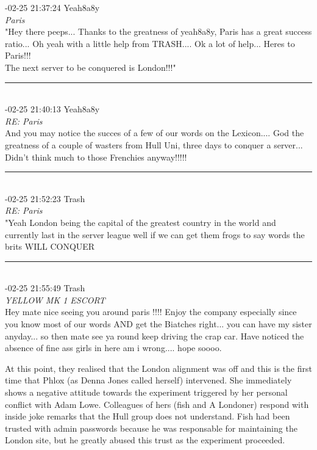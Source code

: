 \begin{mail}
{-02-25 21:37:24 Yeah8a8y}\\
{\itshape Paris}\\
"Hey there peeps... Thanks to the greatness of yeah8a8y, Paris has a great success ratio... Oh yeah with a little help from TRASH.... Ok a lot of help... Heres to Paris!!!\\
The next server to be conquered is London!!!"\\
\rule{0.8\textwidth}{.4pt}\\
{-02-25 21:40:13 Yeah8a8y}\\
{\itshape RE: Paris}\\
And you may notice the succes of a few of our words on the Lexicon.... God the greatness of a couple of wasters from Hull Uni, three days to conquer a server... Didn't think much to those Frenchies anyway!!!!!\\
\rule{0.8\textwidth}{.4pt}\\
{-02-25 21:52:23 Trash}\\
{\itshape RE: Paris}\\
"Yeah London being the capital of the greatest country in the world and currently last in the server league well if we can get them frogs to say words the brits WILL CONQUER\\
\rule{0.8\textwidth}{.4pt}\\
{-02-25 21:55:49 Trash}\\
{\itshape YELLOW MK 1 ESCORT}\\
Hey mate nice seeing you around paris !!!! Enjoy the company especially since you know most of our words AND get the Biatches right... you can have my sister anyday... so then mate see ya round keep driving the crap car.	
Have noticed the absence of fine ass girls in here am i wrong.... hope soooo.\\
 
\end{mail}

At this point, they realised that the London alignment was off and this is the first time that Phlox (as Denna 
Jones called herself) intervened. She immediately shows
a negative attitude towards the experiment triggered by her personal conflict with Adam Lowe. 
Colleagues of hers (fish and A Londoner) respond with inside joke
remarks that the Hull group does not understand. Fish had been trusted with admin passwords because he
was responsable for maintaining the London site, but he greatly abused this trust as the experiment proceeded. 

